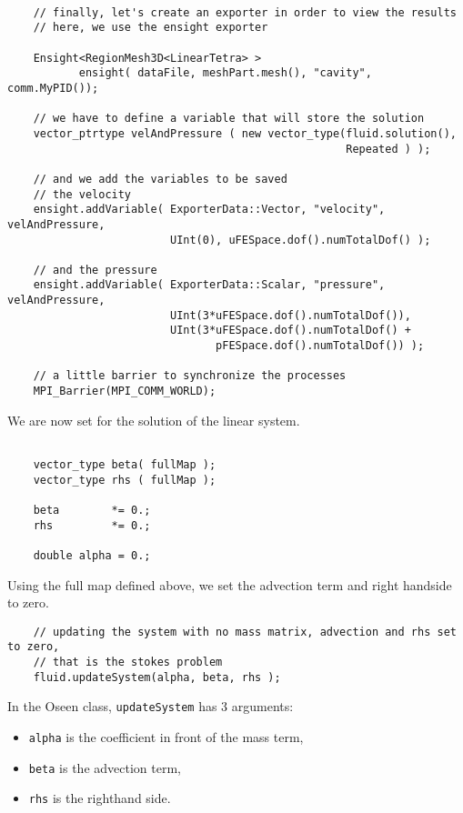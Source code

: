 \begin{verbatim}

    // finally, let's create an exporter in order to view the results
    // here, we use the ensight exporter

    Ensight<RegionMesh3D<LinearTetra> >
           ensight( dataFile, meshPart.mesh(), "cavity", comm.MyPID());

    // we have to define a variable that will store the solution
    vector_ptrtype velAndPressure ( new vector_type(fluid.solution(),
                                                    Repeated ) );

    // and we add the variables to be saved
    // the velocity
    ensight.addVariable( ExporterData::Vector, "velocity", velAndPressure,
                         UInt(0), uFESpace.dof().numTotalDof() );

    // and the pressure
    ensight.addVariable( ExporterData::Scalar, "pressure", velAndPressure,
                         UInt(3*uFESpace.dof().numTotalDof()),
                         UInt(3*uFESpace.dof().numTotalDof() +
                                pFESpace.dof().numTotalDof()) );

    // a little barrier to synchronize the processes
    MPI_Barrier(MPI_COMM_WORLD);
\end{verbatim}


We are now set for the solution of the linear system.

\begin{verbatim}

    vector_type beta( fullMap );
    vector_type rhs ( fullMap );

    beta        *= 0.;
    rhs         *= 0.;

    double alpha = 0.;
\end{verbatim}

Using the full map defined above, we set the advection term and right handside to zero.

\begin{verbatim}
    // updating the system with no mass matrix, advection and rhs set to zero,
    // that is the stokes problem
    fluid.updateSystem(alpha, beta, rhs );
\end{verbatim}

In the Oseen class, \verb|updateSystem| has 3 arguments:
\begin{itemize}
\item \verb|alpha| is the coefficient in front of the mass term,
\item \verb|beta| is the advection term,
\item \verb|rhs| is the righthand side.
\end{itemize}

